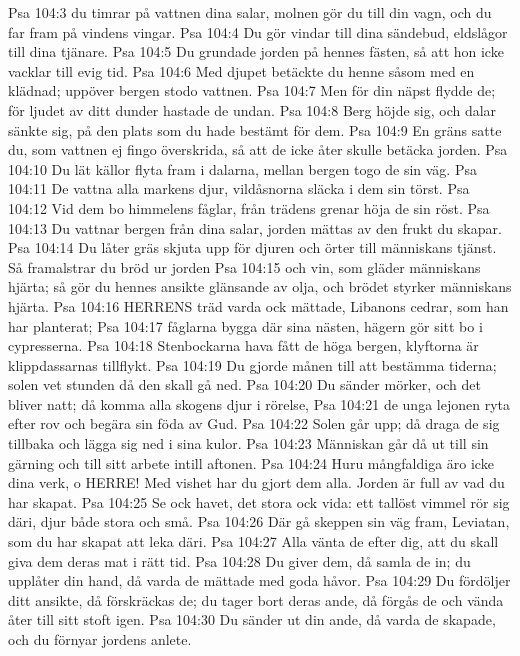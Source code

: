 Psa 104:3  du timrar på vattnen dina salar, molnen gör du till din vagn, och du far fram på vindens vingar.
Psa 104:4  Du gör vindar till dina sändebud, eldslågor till dina tjänare.
Psa 104:5  Du grundade jorden på hennes fästen, så att hon icke vacklar till evig tid.
Psa 104:6  Med djupet betäckte du henne såsom med en klädnad; uppöver bergen stodo vattnen.
Psa 104:7  Men för din näpst flydde de; för ljudet av ditt dunder hastade de undan.
Psa 104:8  Berg höjde sig, och dalar sänkte sig, på den plats som du hade bestämt för dem.
Psa 104:9  En gräns satte du, som vattnen ej fingo överskrida, så att de icke åter skulle betäcka jorden.
Psa 104:10  Du lät källor flyta fram i dalarna, mellan bergen togo de sin väg.
Psa 104:11  De vattna alla markens djur, vildåsnorna släcka i dem sin törst.
Psa 104:12  Vid dem bo himmelens fåglar, från trädens grenar höja de sin röst.
Psa 104:13  Du vattnar bergen från dina salar, jorden mättas av den frukt du skapar.
Psa 104:14  Du låter gräs skjuta upp för djuren och örter till människans tjänst. Så framalstrar du bröd ur jorden
Psa 104:15  och vin, som gläder människans hjärta; så gör du hennes ansikte glänsande av olja, och brödet styrker människans hjärta.
Psa 104:16  HERRENS träd varda ock mättade, Libanons cedrar, som han har planterat;
Psa 104:17  fåglarna bygga där sina nästen, hägern gör sitt bo i cypresserna.
Psa 104:18  Stenbockarna hava fått de höga bergen, klyftorna är klippdassarnas tillflykt.
Psa 104:19  Du gjorde månen till att bestämma tiderna; solen vet stunden då den skall gå ned.
Psa 104:20  Du sänder mörker, och det bliver natt; då komma alla skogens djur i rörelse,
Psa 104:21  de unga lejonen ryta efter rov och begära sin föda av Gud.
Psa 104:22  Solen går upp; då draga de sig tillbaka och lägga sig ned i sina kulor.
Psa 104:23  Människan går då ut till sin gärning och till sitt arbete intill aftonen.
Psa 104:24  Huru mångfaldiga äro icke dina verk, o HERRE! Med vishet har du gjort dem alla. Jorden är full av vad du har skapat.
Psa 104:25  Se ock havet, det stora ock vida: ett tallöst vimmel rör sig däri, djur både stora och små.
Psa 104:26  Där gå skeppen sin väg fram, Leviatan, som du har skapat att leka däri.
Psa 104:27  Alla vänta de efter dig, att du skall giva dem deras mat i rätt tid.
Psa 104:28  Du giver dem, då samla de in; du upplåter din hand, då varda de mättade med goda håvor.
Psa 104:29  Du fördöljer ditt ansikte, då förskräckas de; du tager bort deras ande, då förgås de och vända åter till sitt stoft igen.
Psa 104:30  Du sänder ut din ande, då varda de skapade, och du förnyar jordens anlete.

